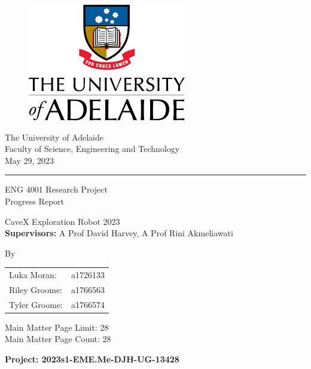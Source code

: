 \documentclass[a4paper,11pt]{article}
\begin{document}
\begin{titlepage}
    \centering
    \begin{figure}[H]
        \centering
        \includegraphics[scale = 0.7]{uoa.png}
    \end{figure}
    
    {\Large \centering The University of Adelaide}
    \\
    {\Large \centering Faculty of Science, Engineering and Technology}
    \\
    {\Large \centering May 29, 2023}
    
    \vspace{1cm}
    
    \rule{\linewidth}{1pt}
    
    \vspace{1.5cm}
    \centering
    
    {\LARGE ENG 4001 Research Project
    \vspace{2mm} \\
    Progress Report}
    
    \vspace{1cm}
    
    {\Large CaveX Exploration Robot 2023
    \vspace{1mm} \\}
    {\textbf{Supervisors:} A Prof David Harvey, A Prof Rini Akmeliawati}

    \vspace{1cm}
    
    {\large By}
    
    \begin{table}[H]
        \centering
        \large
        \begin{tabular}{lr}
            Luka Moran: & a1726133\\
            Riley Groome: & a1766563 \\
            Tyler Groome: & a1766574 \\
        \end{tabular}
    \end{table}
    
    \vspace{1cm}
    
    {\large Main Matter Page Limit: 28}
    \\
    {\large Main Matter Page Count: 28}
\vfill
\begin{flushleft}
\textbf{Project: 2023s1-EME.Me-DJH-UG-13428}
\end{flushleft}
\end{titlepage}
\end{document}
